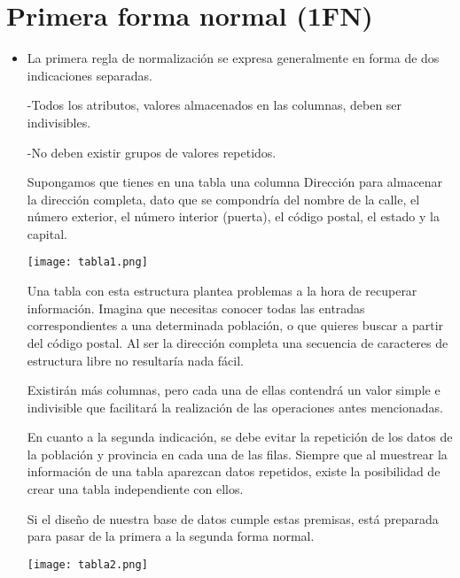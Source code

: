 \documentclass{report}
\begin{document}
	\section{Primera forma normal (1FN)}
	\begin{itemize}
	\item  La primera regla de normalización se expresa generalmente en forma de dos indicaciones 				separadas.

    -Todos los atributos, valores almacenados en las columnas, deben ser indivisibles.
    
    -No deben existir grupos de valores repetidos.
    
    Supongamos que tienes en una tabla una columna Dirección para almacenar la dirección completa, dato 		que se compondría del nombre de la calle, el número exterior, el número interior (puerta), el código 		postal, el estado y la capital.
    
    \texttt{[image: tabla1.png]}
    
    Una tabla con esta estructura plantea problemas a la hora de recuperar información. Imagina que 			necesitas conocer todas las entradas correspondientes a una determinada población, o que quieres 			buscar a partir del código postal. Al ser la dirección completa una secuencia de caracteres de 				estructura libre no resultaría nada fácil.

	Existirán más columnas, pero cada una de ellas contendrá un valor simple e indivisible que facilitará 	la realización de las operaciones antes mencionadas.

	En cuanto a la segunda indicación, se debe evitar la repetición de los datos de la población y 				provincia en cada una de las filas. Siempre que al muestrear la información de una tabla aparezcan 			datos repetidos, existe la posibilidad de crear una tabla independiente con ellos.

	Si el diseño de nuestra base de datos cumple estas premisas, está preparada para pasar de la primera 		a la segunda forma normal.
	
	\texttt{[image: tabla2.png]}

	\end{itemize}
	
\end{document}
